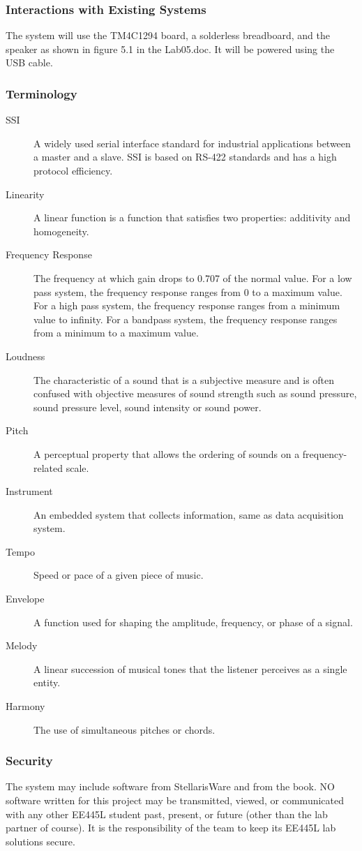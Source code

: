 \documentclass{article}
\begin{document}
		\subsubsection{Interactions with Existing Systems}
			The system will use the TM4C1294 board, a solderless breadboard, and the speaker as shown in figure 5.1 in the Lab05.doc. It will be powered using the USB cable.
		\subsubsection{Terminology}
			\begin{description}
				\item[SSI]
					A widely used serial interface standard for industrial applications between a master and a slave. SSI is based on RS-422 standards and has a high protocol efficiency.
				\item[Linearity]
					A linear function is a function that satisfies two properties: additivity and homogeneity.
				\item[Frequency Response]
					The frequency at which gain drops to 0.707 of the normal value. For a low pass system, the frequency response ranges from 0 to a maximum value. For a high pass system, the frequency response ranges from a minimum value to infinity. For a bandpass system, the frequency response ranges from a minimum to a maximum value.
				\item[Loudness]
					The characteristic of a sound that is a subjective measure and is often confused with objective measures of sound strength such as sound pressure, sound pressure level, sound intensity or sound power.
				\item[Pitch]
					A perceptual property that allows the ordering of sounds on a frequency-related scale.
				\item[Instrument]
					An embedded system that collects information, same as data acquisition system.
				\item[Tempo]
					Speed or pace of a given piece of music.
				\item[Envelope]
					A function used for shaping the amplitude, frequency, or phase of a signal.
				\item[Melody]
					A linear succession of musical tones that the listener perceives as a single entity.
				\item[Harmony]
					The use of simultaneous pitches or chords.
			\end{description}
		\subsubsection{Security}
			The system may include software from StellarisWare and from the book. NO software written for this project may be transmitted, viewed, or communicated with any other EE445L student past, present, or future (other than the lab partner of course). It is the responsibility of the team to keep its EE445L lab solutions secure.
\end{document}
